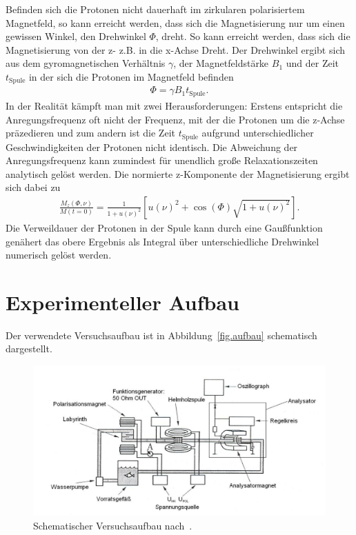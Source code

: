 \documentclass[paper=a4,
	fontsize=10pt,
	DIV=18,
	twocolumn,
	parskip=half
	]{scrartcl}
\numberwithin{equation}{section}    %
\begin{document}
Befinden sich die Protonen nicht dauerhaft im zirkularen polarisiertem Magnetfeld, so kann erreicht werden, dass sich die Magnetisierung nur um einen gewissen Winkel, den Drehwinkel $\Phi$, dreht. So kann erreicht werden, dass sich die Magnetisierung von der z- z.B. in die x-Achse Dreht. Der Drehwinkel ergibt sich aus dem gyromagnetischen Verhältnis $\gamma$, der Magnetfeldstärke $B_1$ und der Zeit $t_\mathrm{Spule}$ in der sich die Protonen im Magnetfeld befinden
\begin{align}
	\Phi=\gamma B_1 t_\mathrm{Spule}.
\end{align}
In der Realität kämpft man mit zwei Herausforderungen: Erstens entspricht die Anregungsfrequenz oft nicht der Frequenz, mit der die Protonen um die z-Achse präzedieren und zum andern ist die Zeit $t_\mathrm{Spule}$ aufgrund unterschiedlicher Geschwindigkeiten der Protonen nicht identisch. Die Abweichung der Anregungsfrequenz kann zumindest für unendlich große Relaxationszeiten analytisch gelöst werden. Die normierte z-Komponente der Magnetisierung ergibt sich dabei zu
\begin{align}
	\frac{M_z(\Phi, \nu)}{M(t=0)}=\frac{1}{1+u(\nu)^2}\left[ u(\nu)^2+\cos(\Phi)\sqrt{1+u(\nu)^2} \right].
\end{align}
Die Verweildauer der Protonen in der Spule kann durch eine Gaußfunktion genähert das obere Ergebnis als Integral über unterschiedliche Drehwinkel numerisch gelöst werden.
%
\section{Experimenteller Aufbau}
\label{Experiment}
%
Der verwendete Versuchsaufbau ist in Abbildung~\ref{fig.aufbau} schematisch dargestellt.

\begin{figure}[htp]
	\begin{center}
		\includegraphics[width=\columnwidth]{Bilder/nmr_aufbau}
		\caption{Schematischer Versuchsaufbau nach~\citet{anleitung}.}
		\label{fig.versuchsaufbau}
	\end{center}
\end{figure}
\end{document}
